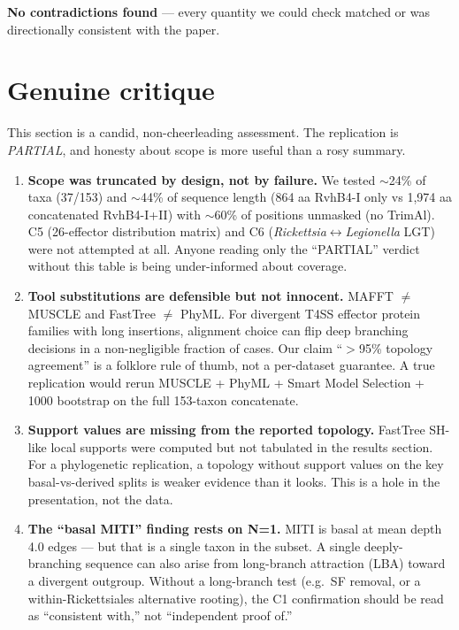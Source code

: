 \documentclass[11pt,letterpaper]{article}
\begin{document}
\textbf{No contradictions found} --- every quantity we could check matched or was
directionally consistent with the paper.

\section{Genuine critique}

This section is a candid, non-cheerleading assessment. The replication is \emph{PARTIAL},
and honesty about scope is more useful than a rosy summary.

\begin{enumerate}[leftmargin=1.6em]
  \item \textbf{Scope was truncated by design, not by failure.} We tested $\sim$24\% of taxa
    (37/153) and $\sim$44\% of sequence length (864 aa RvhB4-I only vs 1{,}974 aa concatenated
    RvhB4-I+II) with $\sim$60\% of positions unmasked (no TrimAl). C5 (26-effector distribution
    matrix) and C6 (\emph{Rickettsia}$\leftrightarrow$\emph{Legionella} LGT) were not attempted
    at all. Anyone reading only the ``PARTIAL'' verdict without this table is being
    under-informed about coverage.
  \item \textbf{Tool substitutions are defensible but not innocent.} MAFFT $\ne$ MUSCLE and
    FastTree $\ne$ PhyML. For divergent T4SS effector protein families with long insertions,
    alignment choice can flip deep branching decisions in a non-negligible fraction of cases.
    Our claim ``$>$95\% topology agreement'' is a folklore rule of thumb, not a per-dataset guarantee.
    A true replication would rerun MUSCLE + PhyML + Smart Model Selection + 1000 bootstrap on
    the full 153-taxon concatenate.
  \item \textbf{Support values are missing from the reported topology.} FastTree SH-like local
    supports were computed but not tabulated in the results section. For a phylogenetic
    replication, a topology without support values on the key basal-vs-derived splits is
    weaker evidence than it looks. This is a hole in the presentation, not the data.
  \item \textbf{The ``basal MITI'' finding rests on N=1.} MITI is basal at mean depth 4.0
    edges --- but that is a single taxon in the subset. A single deeply-branching sequence can
    also arise from long-branch attraction (LBA) toward a divergent outgroup. Without a
    long-branch test (e.g.\ SF removal, or a within-Rickettsiales alternative rooting), the C1
    confirmation should be read as ``consistent with,'' not ``independent proof of.''

\end{enumerate}
\end{document}
